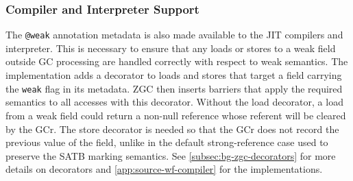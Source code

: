 \subsubsection{Compiler and Interpreter Support}
The \texttt{@weak} annotation metadata is also made available to the \ac{JIT} compilers and interpreter. This is necessary to ensure that any loads or stores to a weak field outside \ac{GC} processing are handled correctly with respect to weak semantics. The implementation adds a decorator to loads and stores that target a field carrying the \texttt{weak} flag in its metadata. \ac{ZGC} then inserts barriers that apply the required semantics to all accesses with this decorator. Without the load decorator, a load from a weak field could return a non-null reference whose referent will be cleared by the \ac{GCr}. The store decorator is needed so that the \ac{GCr} does not record the previous value of the field, unlike in the default strong-reference case used to preserve the \ac{SATB} marking semantics. See \cref{subsec:bg-zgc-decorators} for more details on decorators and \cref{app:source-wf-compiler} for the implementations.
